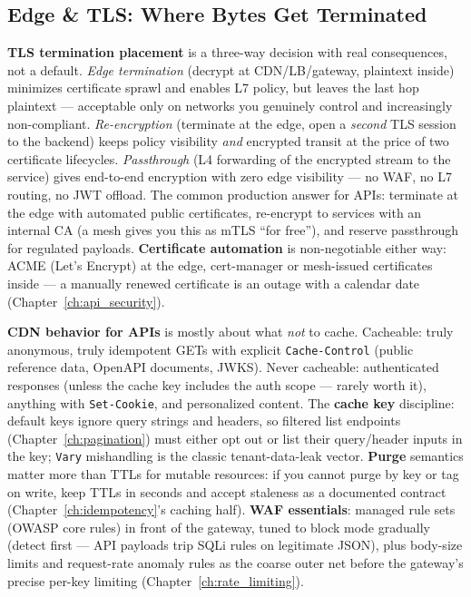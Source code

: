 \subsection{Edge \& TLS: Where Bytes Get Terminated}
\label{sec:ch17-edge}

\textbf{TLS termination placement} is a three-way decision with real
consequences, not a default. \emph{Edge termination} (decrypt at
CDN/LB/gateway, plaintext inside) minimizes certificate sprawl and
enables L7 policy, but leaves the last hop plaintext --- acceptable only
on networks you genuinely control and increasingly non-compliant.
\emph{Re-encryption} (terminate at the edge, open a \emph{second} TLS
session to the backend) keeps policy visibility \emph{and} encrypted
transit at the price of two certificate lifecycles. \emph{Passthrough}
(L4 forwarding of the encrypted stream to the service) gives end-to-end
encryption with zero edge visibility --- no WAF, no L7 routing, no JWT
offload. The common production answer for APIs: terminate at the edge
with automated public certificates, re-encrypt to services with an
internal CA (a mesh gives you this as mTLS ``for free''), and reserve
passthrough for regulated payloads. \textbf{Certificate automation} is
non-negotiable either way: ACME (Let's Encrypt) at the edge,
cert-manager or mesh-issued certificates inside --- a manually renewed
certificate is an outage with a calendar date
(Chapter~\ref{ch:api_security}).

\textbf{CDN behavior for APIs} is mostly about what \emph{not} to cache.
Cacheable: truly anonymous, truly idempotent GETs with explicit
\texttt{Cache-Control} (public reference data, OpenAPI documents, JWKS).
Never cacheable: authenticated responses (unless the cache key includes
the auth scope --- rarely worth it), anything with \texttt{Set-Cookie},
and personalized content. The \textbf{cache key} discipline: default
keys ignore query strings and headers, so filtered list endpoints
(Chapter~\ref{ch:pagination}) must either opt out or list their
query/header inputs in the key; \texttt{Vary} mishandling is the classic
tenant-data-leak vector. \textbf{Purge} semantics matter more than TTLs
for mutable resources: if you cannot purge by key or tag on write, keep
TTLs in seconds and accept staleness as a documented contract
(Chapter~\ref{ch:idempotency}'s caching half). \textbf{WAF essentials}:
managed rule sets (OWASP core rules) in front of the gateway, tuned to
block mode gradually (detect first --- API payloads trip SQLi rules on
legitimate JSON), plus body-size limits and request-rate anomaly rules
as the coarse outer net before the gateway's precise per-key limiting
(Chapter~\ref{ch:rate_limiting}).


